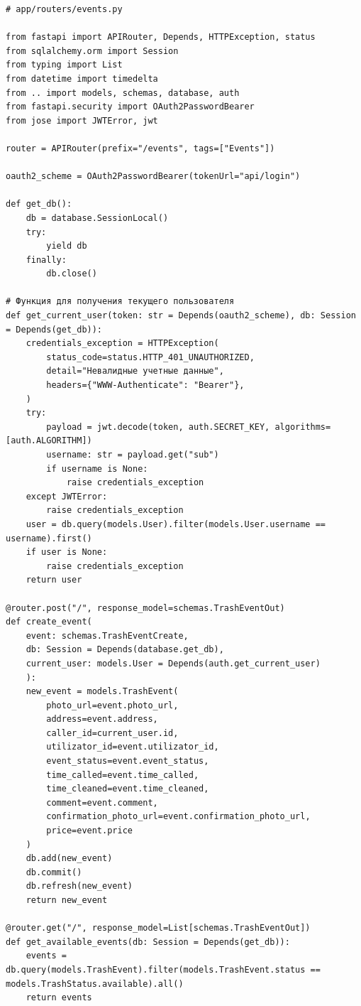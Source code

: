 \documentclass[coursework]{SCWorks}
\begin{document}
\begin{verbatim}
# app/routers/events.py

from fastapi import APIRouter, Depends, HTTPException, status
from sqlalchemy.orm import Session
from typing import List
from datetime import timedelta
from .. import models, schemas, database, auth
from fastapi.security import OAuth2PasswordBearer
from jose import JWTError, jwt

router = APIRouter(prefix="/events", tags=["Events"])

oauth2_scheme = OAuth2PasswordBearer(tokenUrl="api/login")

def get_db():
    db = database.SessionLocal()
    try:
        yield db
    finally:
        db.close()

# Функция для получения текущего пользователя
def get_current_user(token: str = Depends(oauth2_scheme), db: Session = Depends(get_db)):
    credentials_exception = HTTPException(
        status_code=status.HTTP_401_UNAUTHORIZED,
        detail="Невалидные учетные данные",
        headers={"WWW-Authenticate": "Bearer"},
    )
    try:
        payload = jwt.decode(token, auth.SECRET_KEY, algorithms=[auth.ALGORITHM])
        username: str = payload.get("sub")
        if username is None:
            raise credentials_exception
    except JWTError:
        raise credentials_exception
    user = db.query(models.User).filter(models.User.username == username).first()
    if user is None:
        raise credentials_exception
    return user

@router.post("/", response_model=schemas.TrashEventOut)
def create_event(
    event: schemas.TrashEventCreate, 
    db: Session = Depends(database.get_db), 
    current_user: models.User = Depends(auth.get_current_user)
    ):
    new_event = models.TrashEvent(
        photo_url=event.photo_url,
        address=event.address,
        caller_id=current_user.id,
        utilizator_id=event.utilizator_id,
        event_status=event.event_status,
        time_called=event.time_called,
        time_cleaned=event.time_cleaned,
        comment=event.comment,
        confirmation_photo_url=event.confirmation_photo_url,
        price=event.price
    )
    db.add(new_event)
    db.commit()
    db.refresh(new_event)
    return new_event

@router.get("/", response_model=List[schemas.TrashEventOut])
def get_available_events(db: Session = Depends(get_db)):
    events = db.query(models.TrashEvent).filter(models.TrashEvent.status == models.TrashStatus.available).all()
    return events


\end{verbatim}
\end{document}
